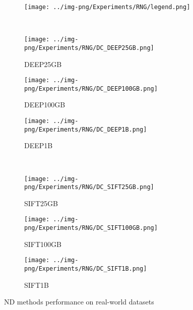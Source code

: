 \begin{figure}[tb]
	\captionsetup{justification=centering}
	\centering	
		\begin{subfigure}{\columnwidth}
			\centering
			\captionsetup{justification=centering}	
			\texttt{[image: ../img-png/Experiments/RNG/legend.png]}
			\label{fig:ND:legend}
		\end{subfigure}\\
		\begin{subfigure}{\sffive}
			\centering
			\captionsetup{justification=centering}	
			\texttt{[image: ../img-png/Experiments/RNG/DC\_DEEP25GB.png]}
		\caption{{DEEP25GB}}
		\label{fig:ND:deep25GB}	
		\end{subfigure}	
		\begin{subfigure}{\sffive}
			\centering
			\captionsetup{justification=centering}	
			\texttt{[image: ../img-png/Experiments/RNG/DC\_DEEP100GB.png]}
		\caption{{DEEP100GB}}
		\label{fig:ND:deep100GB}
		\end{subfigure}	
		\begin{subfigure}{\sffive}
			\centering
			\captionsetup{justification=centering}	
			\texttt{[image: ../img-png/Experiments/RNG/DC\_DEEP1B.png]}
		\caption{{DEEP1B}}%
		\label{fig:ND:deep1b}	
  \end{subfigure}	
  \\
		\begin{subfigure}{\sffive}
			\centering
			\captionsetup{justification=centering}	
			\texttt{[image: ../img-png/Experiments/RNG/DC\_SIFT25GB.png]}
   \caption{{SIFT25GB}}
		\label{fig:ND:sift25GB}
		\end{subfigure}	
		\begin{subfigure}{\sffive}
			\centering
			\captionsetup{justification=centering}	
			\texttt{[image: ../img-png/Experiments/RNG/DC\_SIFT100GB.png]}
             \caption{{SIFT100GB}}
		      \label{fig:ND:sift100GB}
		\end{subfigure}	
		\begin{subfigure}{\sffive}
			\centering
			\captionsetup{justification=centering}	
			\texttt{[image: ../img-png/Experiments/RNG/DC\_SIFT1B.png]}
   \caption{{SIFT1B}}
		\label{fig:ND:sift1b}
		\end{subfigure}	
		\caption{{ND methods performance on real-world datasets}}
	
\label{fig:ND:search:real}
 \end{figure}


